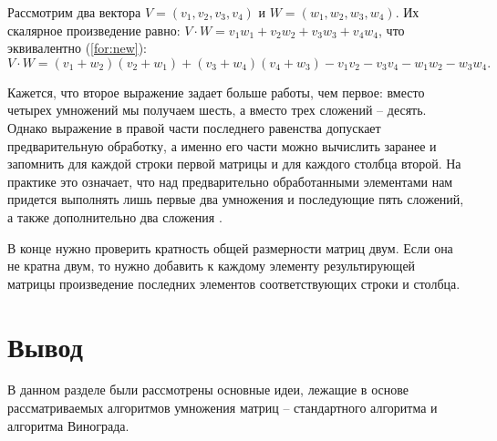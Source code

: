 Рассмотрим два вектора $V = (v_1, v_2, v_3, v_4)$ и $W = (w_1, w_2, w_3, w_4)$.
Их скалярное произведение равно: $V \cdot W = v_1w_1 + v_2w_2 + v_3w_3 + v_4w_4$, что эквивалентно (\ref{for:new}):
\begin{equation}
	\label{for:new}
	V \cdot W = (v_1 + w_2)(v_2 + w_1) + (v_3 + w_4)(v_4 + w_3) - v_1v_2 - v_3v_4 - w_1w_2 - w_3w_4.
\end{equation}

Кажется, что второе выражение задает больше работы, чем первое: вместо четырех умножений мы получаем шесть, а вместо трех сложений -- десять. Однако выражение в правой части последнего равенства допускает предварительную обработку, а именно его части можно вычислить заранее и запомнить для каждой строки первой матрицы и для каждого столбца второй. На практике это означает, что над предварительно обработанными элементами нам придется выполнять лишь первые два умножения и последующие пять сложений, а также дополнительно два сложения \cite{vinograd}.

В конце нужно проверить кратность общей размерности матриц двум. Если она не кратна двум, то нужно добавить к каждому элементу результирующей матрицы произведение последних элементов соответствующих  строки и столбца.


\section*{Вывод}
В данном разделе были рассмотрены основные идеи, лежащие в основе рассматриваемых алгоритмов умножения матриц -- стандартного алгоритма и алгоритма Винограда.
